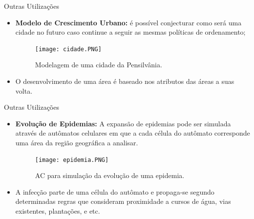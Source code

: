 \documentclass[compress, hide notes]{beamer}
\begin{document}
\begin{frame}{Outras Utilizações \cite{pt}}
		
	\begin{itemize}
	
		\item \textbf{Modelo de Crescimento Urbano:} é possível conjecturar como será uma cidade no futuro caso continue a seguir as mesmas políticas de ordenamento;
	
		\begin{figure}[h]
												
			\center
					
			\texttt{[image: cidade.PNG]}
			\caption{Modelagem de uma cidade da Pensilvânia.}
											
		\end{figure}
        
        \item O desenvolvimento de uma área é baseado nos atributos das áreas a suas volta.
	
	\end{itemize}
	
\end{frame}

\begin{frame}{Outras Utilizações \cite{pt}}
		
	\begin{itemize}
	
		\item \textbf{Evolução de Epidemias:} A expansão de epidemias pode ser simulada através de autômatos celulares em que a cada célula do autômato corresponde uma área da região geográfica a analisar.
	
		\begin{figure}[h]
												
			\center
																	
			\texttt{[image: epidemia.PNG]}
			\caption{AC para simulação da evolução de uma epidemia.}
											
		\end{figure}
		
		\item A	infecção parte de uma célula do autômato e propaga-se segundo determinadas regras que consideram proximidade a cursos de água, vias existentes, plantações, e etc.
	
	\end{itemize}
	
\end{frame}
\end{document}

